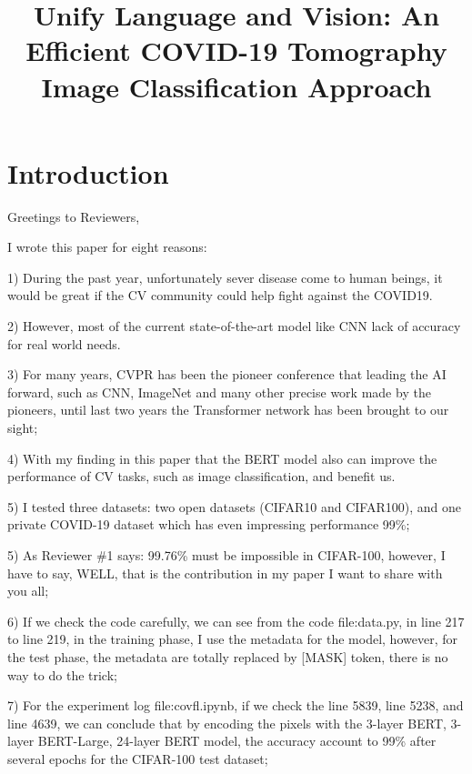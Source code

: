 \documentclass[10pt,twocolumn,letterpaper]{article}
\begin{document}
\title{Unify Language and Vision: An Efficient COVID-19 Tomography Image Classification Approach}  %

\maketitle
\thispagestyle{empty}


\section{Introduction}


Greetings to Reviewers,

I wrote this paper for eight reasons:

1) During the past year, unfortunately sever disease come to human beings, it would be great if the CV community could help fight against the COVID19.

2) However, most of the current state-of-the-art model like CNN lack of accuracy for real world needs.

3) For many years, CVPR has been the pioneer conference that leading the AI forward, such as CNN, ImageNet and many other precise work made by the pioneers, until last two years the Transformer network has been brought to our sight;

4) With my finding in this paper that the BERT model also can improve the performance of CV tasks, such as image classification, and benefit us.

5) I tested three datasets: two open datasets (CIFAR10 and CIFAR100), and one private COVID-19 dataset which has even impressing performance 99\%;

5) As Reviewer \#1 says: 99.76\% must be impossible in CIFAR-100, however, I have to say, WELL, that is the contribution in my paper I want to share with you all;

6) If we check the code carefully, we can see from the code file:data.py, in line 217 to line 219, in the training phase, I use the metadata for the model, however, for the test phase, the metadata are totally replaced by [MASK] token, there is no way to do the trick;

7) For the experiment log file:covfl.ipynb, if we check the line 5839, line 5238, and line 4639, we can conclude that by encoding the pixels with the 3-layer BERT, 3-layer BERT-Large, 24-layer BERT model, the accuracy account to 99\% after several epochs for the CIFAR-100 test dataset;
\end{document}
